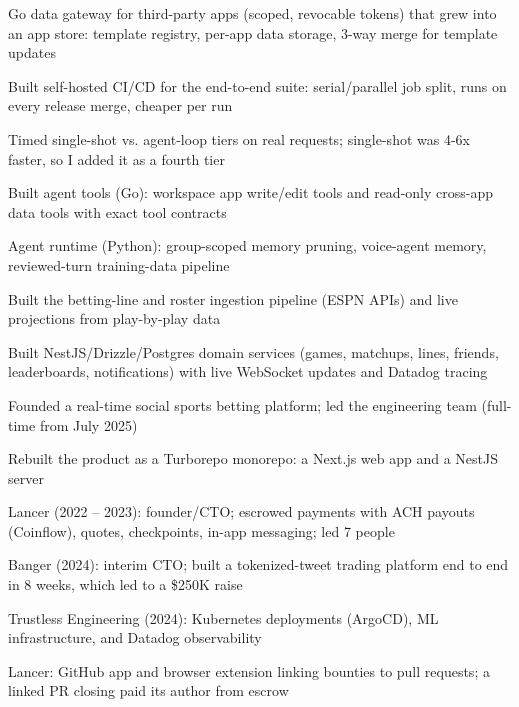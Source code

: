 \documentclass[print]{jack-resume}
\begin{document}
\begin{tightemize}
    \item Go data gateway for third-party apps (scoped, revocable tokens) that grew into an app store: template registry, per-app data storage, 3-way merge for template updates
    \item Built self-hosted CI/CD for the end-to-end suite: serial/parallel job split, runs on every release merge, cheaper per run
    \item Timed single-shot vs. agent-loop tiers on real requests; single-shot was 4-6x faster, so I added it as a fourth tier
    \item Built agent tools (Go): workspace app write/edit tools and read-only cross-app data tools with exact tool contracts
    \item Agent runtime (Python): group-scoped memory pruning, voice-agent memory, reviewed-turn training-data pipeline
\end{tightemize}
\sectionsep

\begin{tightemize}
    \item Built the betting-line and roster ingestion pipeline (ESPN APIs) and live projections from play-by-play data
    \item Built NestJS/Drizzle/Postgres domain services (games, matchups, lines, friends, leaderboards, notifications) with live WebSocket updates and Datadog tracing
    \item Founded a real-time social sports betting platform; led the engineering team (full-time from July 2025)
    \item Rebuilt the product as a Turborepo monorepo: a Next.js web app and a NestJS server
\end{tightemize}
\sectionsep

\begin{tightemize}
    \item Lancer (2022 -- 2023): founder/CTO; escrowed payments with ACH payouts (Coinflow), quotes, checkpoints, in-app messaging; led 7 people
    \item Banger (2024): interim CTO; built a tokenized-tweet trading platform end to end in 8 weeks, which led to a \$250K raise
    \item Trustless Engineering (2024): Kubernetes deployments (ArgoCD), ML infrastructure, and Datadog observability
    \item Lancer: GitHub app and browser extension linking bounties to pull requests; a linked PR closing paid its author from escrow
\end{tightemize}
\sectionsep
\end{document}
